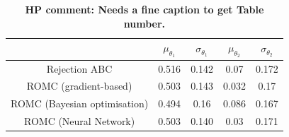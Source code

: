\begin{table}
\begin{center}
\begin{tabular}{ c|c|c|c|c }
\hline
& \(\mu_{\theta_1}\) & \(\sigma_{\theta_1}\) & \(\mu_{\theta_2}\) & \(\sigma_{\theta_2}\) \\
\hline \hline
Rejection ABC & 0.516 & 0.142 & 0.07 & 0.172 \\
\hline
ROMC (gradient-based) & 0.503 & 0.143 & 0.032 & 0.17 \\
\hline
ROMC (Bayesian optimisation) & 0.494 & 0.16 & 0.086 & 0.167 \\
\hline
ROMC (Neural Network) & 0.503 & 0.140 & 0.03 & 0.171 \\
\hline
\end{tabular}
\end{center}
\caption{\textbf{HP comment: Needs a fine caption to get Table number.}\label{tab:ma2}}
\end{table}

